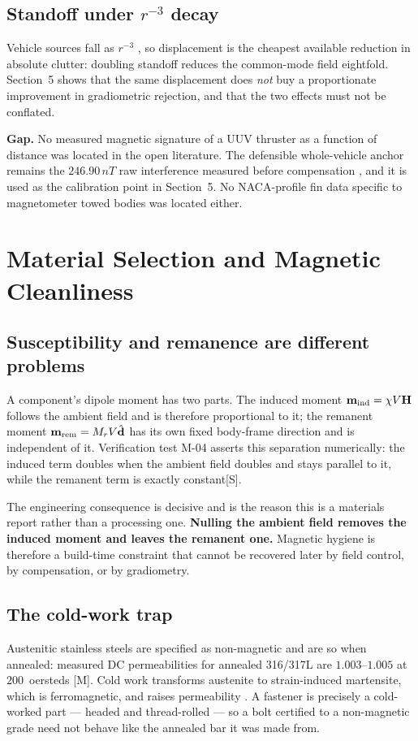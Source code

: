 \documentclass[11pt]{article}
\newcommand{\nT}{\,nT}\newcommand{\pT}{\,pT}\newcommand{\fT}{\,fT}
\newcommand{\meas}{\textcolor{blue!55!black}{\footnotesize[M]}}
\newcommand{\sig}{\textcolor{violet!70!black}{\footnotesize[S]}}
\begin{document}
\subsection{Standoff under $r^{-3}$ decay}
Vehicle sources fall as $r^{-3}$ \cite{jackson1998}, so displacement is the
cheapest available reduction in absolute clutter: doubling standoff reduces the
common-mode field eightfold. Section~5 shows that the same displacement does
\emph{not} buy a proportionate improvement in gradiometric rejection, and that
the two effects must not be conflated.

\textbf{Gap.} No measured magnetic signature of a UUV thruster as a function of
distance was located in the open literature. The defensible whole-vehicle
anchor remains the $246.90\nT$ raw interference measured before compensation
\cite{oehler2024}, and it is used as the calibration point in Section~5. No
NACA-profile fin data specific to magnetometer towed bodies was located either.

\section{Material Selection and Magnetic Cleanliness}
\subsection{Susceptibility and remanence are different problems}
A component's dipole moment has two parts. The induced moment
$\mathbf{m}_{\rm ind}=\chi V \mathbf{H}$ follows the ambient field and is
therefore proportional to it; the remanent moment $\mathbf{m}_{\rm rem}=M_r V
\hat{\mathbf{d}}$ has its own fixed body-frame direction and is independent of
it. Verification test M-04 asserts this separation numerically: the induced term
doubles when the ambient field doubles and stays parallel to it, while the
remanent term is exactly constant\sig.

The engineering consequence is decisive and is the reason this is a materials
report rather than a processing one. \textbf{Nulling the ambient field removes
the induced moment and leaves the remanent one.} Magnetic hygiene is therefore a
build-time constraint that cannot be recovered later by field control, by
compensation, or by gradiometry.

\subsection{The cold-work trap}
Austenitic stainless steels are specified as non-magnetic and are so when
annealed: measured DC permeabilities for annealed 316/317L are $1.003$--$1.005$
at $200$~oersteds \cite{assda}\meas. Cold work transforms austenite to
strain-induced martensite, which is ferromagnetic, and raises permeability
\cite{bssa}. A fastener is precisely a cold-worked part --- headed and
thread-rolled --- so a bolt certified to a non-magnetic grade need not behave
like the annealed bar it was made from.
\end{document}
